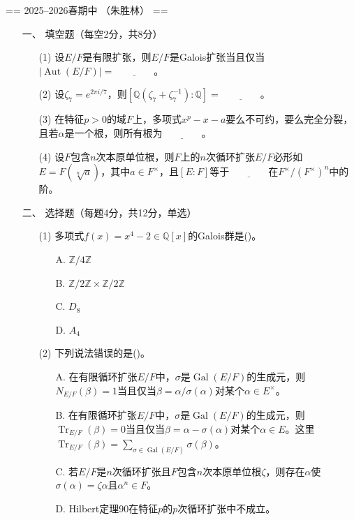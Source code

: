 == 2025--2026春期中 （朱胜林） ==
\begin{itemize}

\item[一、] 填空题（每空2分，共8分）
\begin{itemize}
\item[(1)] 设$E/F$是有限扩张，则$E/F$是Galois扩张当且仅当$|\operatorname{Aut}(E/F)|=\underline{\qquad\qquad}$。

\item[(2)] 设$\zeta_7=e^{2\pi i/7}$，则$[\mathbb{Q}(\zeta_7+\zeta_7^{-1}):\mathbb{Q}]=\underline{\qquad\qquad}$。

\item[(3)] 在特征$p>0$的域$F$上，多项式$x^p-x-a$要么不可约，要么完全分裂，且若$\alpha$是一个根，则所有根为$\underline{\qquad\qquad}$。

\item[(4)] 设$F$包含$n$次本原单位根，则$F$上的$n$次循环扩张$E/F$必形如$E=F(\sqrt[n]{a})$，其中$a\in F^\times$，且$[E:F]$等于$\underline{\qquad\qquad}$在$F^\times/(F^\times)^n$中的阶。
\end{itemize}

\item[二、] 选择题（每题4分，共12分，单选）
\begin{itemize}
\item[(1)] 多项式$f(x)=x^4-2\in\mathbb{Q}[x]$的Galois群是(\quad)。
\begin{itemize}
\item[A.] $\mathbb{Z}/4\mathbb{Z}$
\item[B.] $\mathbb{Z}/2\mathbb{Z}\times\mathbb{Z}/2\mathbb{Z}$
\item[C.] $D_8$
\item[D.] $A_4$
\end{itemize}

\item[(2)] 下列说法错误的是(\quad)。
\begin{itemize}
\item[A.] 在有限循环扩张$E/F$中，$\sigma$是$\operatorname{Gal}(E/F)$的生成元，则$N_{E/F}(\beta)=1$当且仅当$\beta=\alpha/\sigma(\alpha)$对某个$\alpha\in E^\times$。
\item[B.] 在有限循环扩张$E/F$中，$\sigma$是$\operatorname{Gal}(E/F)$的生成元，则$\operatorname{Tr}_{E/F}(\beta)=0$当且仅当$\beta=\alpha-\sigma(\alpha)$对某个$\alpha\in E$。这里$\operatorname{Tr}_{E/F}(\beta)=\sum_{\sigma\in\operatorname{Gal}(E/F)}\sigma(\beta)$。
\item[C.] 若$E/F$是$n$次循环扩张且$F$包含$n$次本原单位根$\zeta$，则存在$\alpha$使$\sigma(\alpha)=\zeta\alpha$且$\alpha^n\in F$。
\item[D.] Hilbert定理90在特征$p$的$p$次循环扩张中不成立。
\end{itemize}


\end{itemize}
\end{itemize}
